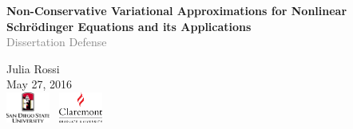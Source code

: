 
{ %
\begin{frame}[c]
\begin{center}
	\vspace{1em}
	\large{ \bfseries Non-Conservative Variational Approximations for Nonlinear Schr\"{o}dinger Equations and its Applications} \\ 
	\vspace{3em}
	\textcolor{gray}{Dissertation Defense} \\
	\vspace{1em}
	
	  \normalsize { Julia Rossi } \\ 
	 \vspace{1em}	
	\textcolor{normal text.fg!50!Comment}{May  27, 2016} \\
	\vspace{1em}
	\includegraphics[height=1cm]{sdsu}
	\quad ~\includegraphics[height=1cm]{Claremont_Graduate_University_logo}\\

\end{center}
\end{frame}
}



